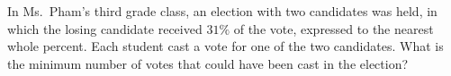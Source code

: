 In Ms.\ Pham's third grade class, an election with two candidates was held, in which the losing candidate received $31\%$ of the vote, expressed to the nearest whole percent. Each student cast a vote for one of the two candidates. What is the minimum number of votes that could have been cast in the election?
